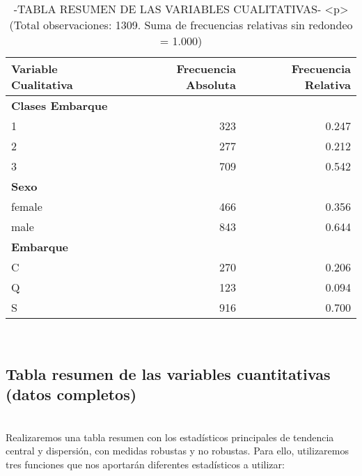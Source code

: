 \documentclass[
]{article}
\begin{document}
\begin{table}

\caption{\label{tab:unnamed-chunk-98}-TABLA RESUMEN DE LAS VARIABLES CUALITATIVAS-
      <p> (Total observaciones: 1309. Suma de frecuencias relativas sin redondeo = 1.000)}
\centering
\begin{tabular}[t]{l|r|r}
\hline
Variable Cualitativa & Frecuencia Absoluta & Frecuencia Relativa\\
\hline
\multicolumn{3}{l}{\textbf{Clases Embarque}}\\
\hline
\hspace{1em}1 & 323 & 0.247\\
\hline
\hspace{1em}2 & 277 & 0.212\\
\hline
\hspace{1em}3 & 709 & 0.542\\
\hline
\multicolumn{3}{l}{\textbf{Sexo}}\\
\hline
\hspace{1em}female & 466 & 0.356\\
\hline
\hspace{1em}male & 843 & 0.644\\
\hline
\multicolumn{3}{l}{\textbf{Embarque}}\\
\hline
\hspace{1em}C & 270 & 0.206\\
\hline
\hspace{1em}Q & 123 & 0.094\\
\hline
\hspace{1em}S & 916 & 0.700\\
\hline
\end{tabular}
\end{table}

\texttt{}\\
\texttt{}

\hypertarget{tabla-resumen-de-las-variables-cuantitativas-datos-completos}{%
\subsection{Tabla resumen de las variables cuantitativas (datos
completos)}\label{tabla-resumen-de-las-variables-cuantitativas-datos-completos}}

\texttt{}\\
Realizaremos una tabla resumen con los estadísticos principales de
tendencia central y dispersión, con medidas robustas y no robustas. Para
ello, utilizaremos tres funciones que nos aportarán diferentes
estadísticos a utilizar: \texttt{}
\end{document}
